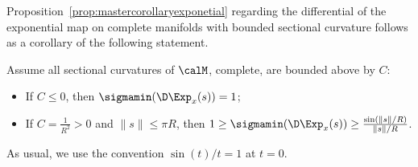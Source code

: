 Proposition~\ref{prop:mastercorollaryexponetial} regarding the differential of the exponential map on complete manifolds with bounded sectional curvature follows as a corollary of the following statement.
\begin{lemma} \label{lemma:exponentialbound}
	Assume all sectional curvatures of $\calM$, complete, are bounded above by $C$:
	\begin{itemize}
		\item[] If $C \leq 0$, then $\sigmamin(\D\Exp_x(s)) = 1$;
		\item[] If $C = \frac{1}{R^2} > 0$ and $\|s\| \leq \pi R$, then $1 \geq \sigmamin(\D\Exp_x(s)) \geq \frac{\sin(\|s\|/R)}{\|s\|/R}$.
	\end{itemize}
	As usual, we use the convention $\sin(t)/t = 1$ at $t = 0$.
\end{lemma}

